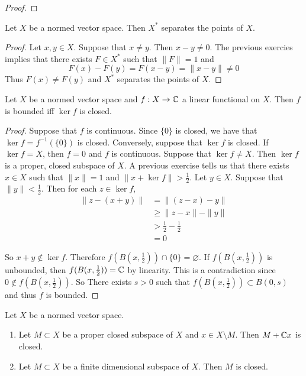 \documentclass{book}
\begin{document}
	\begin{proof}
\end{proof}		
		
	\begin{ex} 
		Let $X$ be a normed vector space. Then $X^*$ separates the points of $X$. 
	\end{ex}
	
	\begin{proof}
		Let $x, y \in X$. Suppose that $x \neq y$. Then $x-y \neq 0$. The previous exercies implies that there exists $F \in X^*$ such that $\|F \|= 1$ and $$F(x) - F(y) = F(x-y) = \|x-y \|\neq 0$$ Thus $F(x) \neq F(y)$ and $X^*$ separates the points of $X$.
	\end{proof}
	
	
	\begin{ex} 
		Let $X$ be a normed vector space and $f:X \rightarrow \mathbb{C}$ a linear functional on $X$. Then $f$ is bounded iff $\ker f$ is closed. 
	\end{ex}
	
	\begin{proof}
		Suppose that $f$ is continuous. Since $\{0\}$ is closed, we have that $\ker f = f^{-1}(\{0\})$ is closed. Conversely, suppose that $\ker f$ is closed. If $\ker f = X$, then $f =0$ and $f$ is continuous. Suppose that $\ker f \neq X$. Then $\ker f$ is a proper, closed subspace of $X$. A previous exercise tells us that there exists $x \in X$ such that $\|x \|= 1$ and $\|x + \ker f \|> \frac{1}{2}$. Let $y \in X$. Suppose that $\|y \|< \frac{1}{2}$. Then for each $z \in \ker f$, 
		\begin{align*}
			\|z -  (x+y)\|
			& = \|(z-x) -y \|\\
			& \geq \|z-x \|- \|y \|\\
			& > \frac{1}{2} - \frac{1}{2} \\
			&=0
		\end{align*}
		
		So $x+y \not \in \ker f$. Therefore $f(B(x,\frac{1}{2})) \cap \{0\} = \varnothing$. If $f(B(x,\frac{1}{2})) $ is unbounded, then $f(B(x,\frac{1}{2})) = \mathbb{C}$ by linearity. This is a contradiction since $0 \not \in f(B(x,\frac{1}{2}))$. So There exists $s > 0$ such that $f(B(x,\frac{1}{2})) \subset B(0,s)$ and thus $f$ is bounded. 
	\end{proof}
	
	\begin{ex} 
		Let $X$ be a normed vector space. 
		\begin{enumerate}
			\item Let $M \subset X$ be a proper closed subspace of $X$ and $x \in X \setminus M$. Then $M + \mathbb{C} x$ is closed.
			\item Let $M \subset X$ be a finite dimensional subspace of $X$. Then $M$ is closed.
		\end{enumerate}
	\end{ex}
	
\end{document}
